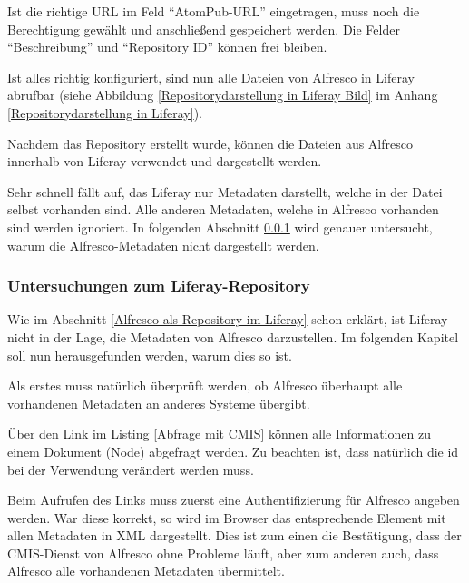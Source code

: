 Ist die richtige URL im Feld "`AtomPub-URL"' eingetragen, muss noch die Berechtigung gew\"ahlt und anschlie\ss{}end gespeichert werden. Die Felder "`Beschreibung"' und "`Repository ID"' k\"onnen frei bleiben.

Ist alles richtig konfiguriert, sind nun alle Dateien von Alfresco in Liferay abrufbar (siehe Abbildung \ref{Repositorydarstellung in Liferay Bild} im Anhang \ref{Repositorydarstellung in Liferay}). \cite{CMIS_Repo}

Nachdem das Repository erstellt wurde, k\"onnen die Dateien aus Alfresco innerhalb von Liferay verwendet und dargestellt werden.

Sehr schnell f\"allt auf, das Liferay nur Metadaten darstellt, welche in der Datei selbst vorhanden sind. Alle anderen Metadaten, welche in Alfresco vorhanden sind werden ignoriert. In folgenden Abschnitt \ref{Untersuchungen zum Liferay-Repository} wird genauer untersucht, warum die Alfresco-Metadaten nicht dargestellt werden. \cite{Intregrate_as_Repo}

\subsubsection{Untersuchungen zum Liferay-Repository}\label{Untersuchungen zum Liferay-Repository}
Wie im Abschnitt \ref{Alfresco als Repository im Liferay} schon erkl\"art, ist Liferay nicht in der Lage, die Metadaten von Alfresco darzustellen. Im folgenden Kapitel soll nun herausgefunden werden, warum dies so ist.

Als erstes muss nat\"urlich \"uberpr\"uft werden, ob Alfresco \"uberhaupt alle vorhandenen Metadaten an anderes Systeme \"ubergibt.

\"Uber den Link im Listing \ref{Abfrage mit CMIS} k\"onnen alle Informationen zu einem Dokument (Node) abgefragt werden. Zu beachten ist, dass nat\"urlich die id bei der Verwendung ver\"andert werden muss. \cite{GetNodeInfo}



Beim Aufrufen des Links muss zuerst eine Authentifizierung f\"ur Alfresco angeben werden. War diese korrekt, so wird im Browser das entsprechende Element mit allen Metadaten in XML dargestellt. Dies ist zum einen die Best\"atigung, dass der \ac{CMIS}-Dienst von Alfresco ohne Probleme l\"auft, aber zum anderen auch, dass Alfresco alle vorhandenen Metadaten \"ubermittelt.

